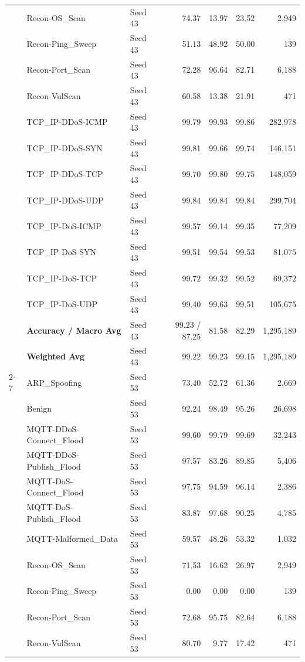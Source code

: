 \documentclass[a4paper,fleqn]{cas-sc}
\begin{document}
{\begin{landscape}
\begin{longtable}{lllrrrr}
 & Recon-OS\_Scan & Seed 43 & 74.37 & 13.97 & 23.52 & 2,949 \\
 & Recon-Ping\_Sweep & Seed 43 & 51.13 & 48.92 & 50.00 & 139 \\
 & Recon-Port\_Scan & Seed 43 & 72.28 & 96.64 & 82.71 & 6,188 \\
 & Recon-VulScan & Seed 43 & 60.58 & 13.38 & 21.91 & 471 \\
 & TCP\_IP-DDoS-ICMP & Seed 43 & 99.79 & 99.93 & 99.86 & 282,978 \\
 & TCP\_IP-DDoS-SYN & Seed 43 & 99.81 & 99.66 & 99.74 & 146,151 \\
 & TCP\_IP-DDoS-TCP & Seed 43 & 99.70 & 99.80 & 99.75 & 148,059 \\
 & TCP\_IP-DDoS-UDP & Seed 43 & 99.84 & 99.84 & 99.84 & 299,704 \\
 & TCP\_IP-DoS-ICMP & Seed 43 & 99.57 & 99.14 & 99.35 & 77,209 \\
 & TCP\_IP-DoS-SYN & Seed 43 & 99.51 & 99.54 & 99.53 & 81,075 \\
 & TCP\_IP-DoS-TCP & Seed 43 & 99.72 & 99.32 & 99.52 & 69,372 \\
 & TCP\_IP-DoS-UDP & Seed 43 & 99.40 & 99.63 & 99.51 & 105,675 \\
 & \textbf{Accuracy / Macro Avg} & Seed 43 & 99.23 / 87.25 & 81.58 & 82.29 & 1,295,189 \\
 & \textbf{Weighted Avg} & Seed 43 & 99.22 & 99.23 & 99.15 & 1,295,189 \\
\cline{2-7}
 & ARP\_Spoofing & Seed 53 & 73.40 & 52.72 & 61.36 & 2,669 \\
 & Benign & Seed 53 & 92.24 & 98.49 & 95.26 & 26,698 \\
 & MQTT-DDoS-Connect\_Flood & Seed 53 & 99.60 & 99.79 & 99.69 & 32,243 \\
 & MQTT-DDoS-Publish\_Flood & Seed 53 & 97.57 & 83.26 & 89.85 & 5,406 \\
 & MQTT-DoS-Connect\_Flood & Seed 53 & 97.75 & 94.59 & 96.14 & 2,386 \\
 & MQTT-DoS-Publish\_Flood & Seed 53 & 83.87 & 97.68 & 90.25 & 4,785 \\
 & MQTT-Malformed\_Data & Seed 53 & 59.57 & 48.26 & 53.32 & 1,032 \\
 & Recon-OS\_Scan & Seed 53 & 71.53 & 16.62 & 26.97 & 2,949 \\
 & Recon-Ping\_Sweep & Seed 53 & 0.00 & 0.00 & 0.00 & 139 \\
 & Recon-Port\_Scan & Seed 53 & 72.68 & 95.75 & 82.64 & 6,188 \\
 & Recon-VulScan & Seed 53 & 80.70 & 9.77 & 17.42 & 471 \\

\end{longtable}
\end{landscape}}
\end{document}
